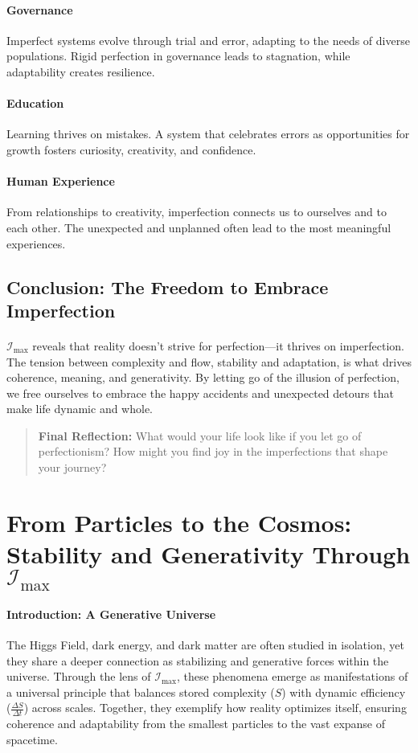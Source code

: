 \documentclass[12pt]{article}
\begin{document}
\paragraph{Governance} Imperfect systems evolve through trial and error, adapting to the needs of diverse populations. Rigid perfection in governance leads to stagnation, while adaptability creates resilience.

\paragraph{Education} Learning thrives on mistakes. A system that celebrates errors as opportunities for growth fosters curiosity, creativity, and confidence.

\paragraph{Human Experience} From relationships to creativity, imperfection connects us to ourselves and to each other. The unexpected and unplanned often lead to the most meaningful experiences.

\subsection*{Conclusion: The Freedom to Embrace Imperfection}
\paragraph{}
\(\mathcal{I}_{\text{max}}\) reveals that reality doesn’t strive for perfection—it thrives on imperfection. The tension between complexity and flow, stability and adaptation, is what drives coherence, meaning, and generativity. By letting go of the illusion of perfection, we free ourselves to embrace the happy accidents and unexpected detours that make life dynamic and whole.

\begin{quote}
\textbf{Final Reflection:}  
What would your life look like if you let go of perfectionism? How might you find joy in the imperfections that shape your journey?
\end{quote}


\section{From Particles to the Cosmos: Stability and Generativity Through \(\mathcal{I}_{\text{max}}\)}

\paragraph{Introduction: A Generative Universe}
The Higgs Field, dark energy, and dark matter are often studied in isolation, yet they share a deeper connection as stabilizing and generative forces within the universe. Through the lens of \(\mathcal{I}_{\text{max}}\), these phenomena emerge as manifestations of a universal principle that balances stored complexity (\(S\)) with dynamic efficiency (\(\frac{\Delta S}{\Delta t}\)) across scales. Together, they exemplify how reality optimizes itself, ensuring coherence and adaptability from the smallest particles to the vast expanse of spacetime.
\end{document}
